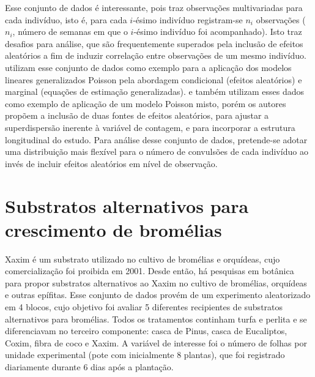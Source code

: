 \documentclass[
    oldfontcommands,
    11pt,
    openright,
    twoside,
    a4paper,
    english,
    brazil
]{abntex2}\usepackage[]{graphicx}\usepackage[]{color}
\begin{document}
Esse conjunto de dados é interessante, pois traz observações
multivariadas para cada indivíduo, isto é, para cada $i$-ésimo indivíduo
registram-se $n_i$ observações ($n_i$, número de semanas em que o
$i$-ésimo indivíduo foi acompanhado). Isto traz desafios para análise,
que são frequentemente superados pela inclusão de efeitos aleatórios a
fim de induzir correlação entre observações de um mesmo
indivíduo. \citet{Molenberghs2005} utilizam esse conjunto de dados como
exemplo para a aplicação dos modelos lineares generalizados Poisson pela
abordagem condicional (efeitos aleatórios) e marginal (equações de
estimação generalizadas). \citet{Molenberghs2007} e
\citet{Molenberghs2010} também utilizam esses dados como exemplo de
aplicação de um modelo Poisson misto, porém os autores propõem a
inclusão de duas fontes de efeitos aleatórios, para ajustar a
superdispersão inerente à variável de contagem, e para incorporar a
estrutura longitudinal do estudo. Para análise desse conjunto de dados,
pretende-se adotar uma distribuição mais flexível para o número de
convulsões de cada indivíduo ao invés de incluir efeitos aleatórios em
nível de observação.

\section{Substratos alternativos para crescimento de bromélias}
\label{sec:bromelia}

Xaxim é um substrato utilizado no cultivo de bromélias e orquídeas, cujo
comercialização foi proibida em 2001. Desde então, há pesquisas em
botânica para propor substratos alternativos ao Xaxim no cultivo de
bromélias, orquídeas e outras epífitas. Esse conjunto de dados provém de
um experimento aleatorizado em 4 blocos, cujo objetivo foi avaliar 5
diferentes recipientes de substratos alternativos para bromélias. Todos
os tratamentos continham turfa e perlita e se diferenciavam no terceiro
componente: casca de Pinus, casca de Eucaliptos, Coxim, fibra de coco e
Xaxim. A variável de interesse foi o número de folhas por unidade
experimental (pote com inicialmente 8 plantas), que foi registrado
diariamente durante 6 dias após a plantação.
\end{document}
